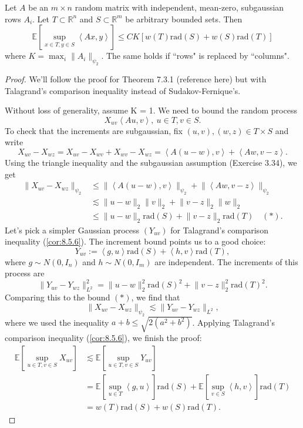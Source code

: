 \begin{theorem}
\label{thm:8.6.1}
Let $A$ be an $m \times n$ random matrix with independent, mean-zero, subgaussian rows $A_i$. Let $T \subset 
\mathbb{R}^n$ and $S \subset \mathbb{R}^m$ be arbitrary bounded sets. Then 
\[ \mathbb{E}\left[ \sup_{x \in T, y \in S} \left\langle Ax, y \right\rangle \right] \leq 
CK [w(T) \mathrm{rad}(S) + w(S) \mathrm{rad}(T)] \]
where $K = \max_{i} \lVert A_i \rVert_{\psi_2}$. The same holds if ``rows" is replaced by ``columns".
\end{theorem}

\begin{proof}
We'll follow the proof for Theorem 7.3.1 (reference here) but with Talagrand's comparison inequality instead of 
Sudakov-Fernique's.

Without loss of generality, assume K = 1. We need to bound the random process 
\[ X_{uv}\left\langle Au, v \right\rangle, \ u \in T, v \in S. \]
To check that the increments are subgaussian, fix $(u, v), (w, z) \in T \times S$ and write 
\[ X_{uv} - X_{wz} = X_{uv} - X_{wv} + X_{wv} - X_{wz} = \left\langle A(u - w), v \right\rangle 
+ \left\langle Aw, v - z \right\rangle. \]
Using the triangle inequality and the subgaussian assumption (Exercise 3.34), we get 
\begin{align*}
	\lVert X_{uv} - X_{wz} \rVert_{\psi_2} 
	&\leq \lVert \left\langle A(u - w), v \right\rangle \rVert_{\psi_2} 
	+ \lVert \left\langle Aw, v - z \right\rangle \rVert_{\psi_2} \\
	&\lesssim \lVert u - w \rVert_{2}\lVert v \rVert_{2} + \lVert v - z \rVert_{2}\lVert w \rVert_{2} \\
	&\leq \lVert u - w \rVert_{2}\mathrm{rad}(S) + \lVert v - z \rVert_{2}\mathrm{rad}(T) \quad (*).
\end{align*}
Let's pick a simpler Gaussian process $(Y_{uv})$ for Talagrand's comparison inequality (\cref{cor:8.5.6}). The 
increment bound points us to a good choice:
\[ Y_{uv} := \left\langle g, u \right\rangle \mathrm{rad}(S) + \left\langle h, v \right\rangle 
\mathrm{rad}(T), \]
where $g \sim N(0, I_n)$ and $h \sim N(0, I_m)$ are independent. The increments of this process are 
\[ \lVert Y_{uv} - Y_{wz} \rVert_{L^2}^2 = \lVert u - w \rVert_{2}^2 \mathrm{rad}(S)^2 
+ \lVert v - z \rVert_{2}^2 \mathrm{rad}(T)^2. \]
Comparing this to the bound $(*)$, we find that 
\[ \lVert X_{uv} - X_{wz} \rVert_{\psi_2} \lesssim \lVert Y_{uv} - Y_{wz} \rVert_{L^2}, \]
where we used the inequality $a + b \leq \sqrt{2 (a^2 + b^2)}$. Applying Talagrand's comparison inequality 
(\cref{cor:8.5.6}), we finish the proof:
\begin{align*}
	\mathbb{E}\left[ \sup_{u \in T, v \in S}X_{uv} \right] 
	&\lesssim \mathbb{E}\left[ \sup_{u \in T, v \in S}Y_{uv} \right] \\
	&= \mathbb{E}\left[ \sup_{u \in T}\left\langle g, u \right\rangle \right] \mathrm{rad}(S) 
	+ \mathbb{E}\left[ \sup_{v \in S}\left\langle h, v \right\rangle \right] \mathrm{rad}(T) \\
	&= w(T) \mathrm{rad}(S) + w(S) \mathrm{rad}(T).
\end{align*}
\end{proof}

